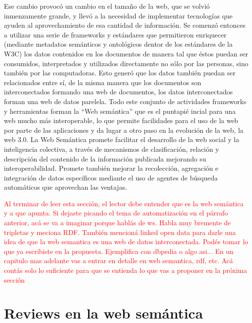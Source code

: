 Ese cambio provocó un cambio en el tamaño de la web, que se volvió inmenzamente grande, y llevó a la necesidad de implementar tecnologías que ayuden al aprovechamiento de esa cantidad de información. 
Se comenzó entonces a utilizar una serie de frameworks y estándares que permitieron enriquecer (mediante metadatos semánticos y ontológicos dentor de los estándares de la W3C) los datos contenidos en los documentos de manera tal que éstos puedan ser consumidos, interpretados y utilizados directamente no sólo por las personas, sino también por las computadoras.
Esto generó que los datos también puedan ser relacionados entre sí, de la misma manera que los documentos son interconectados formando una web de documentos, los datos interconectados forman una web de datos parelela.
Todo este conjunto de actividades frameworks y herramientas forman la ``Web semántica'' que es el puntapié incial para una web mucho más interoperable, lo que permite facilidades para el uso de la web por parte de las aplicaciones y da lugar a otro paso en la evolución de la web, la web 3.0. 
La Web Semántica promete facilitar el desarrollo de la web social y la inteligencia colectiva, a través de mecanismos de clasificación, relación y descripción del contenido de la información publicada mejorando su interoperabilidad. Promete también mejorar la recolección, agregación e integración de datos específicos mediante el uso de agentes de búsqueda automáticos que aprovechan las ventajas.

\begin{framed}
\textcolor{red}{Al terminar de leer esta sección, el lector debe entender que es la web semántica y a que apunta. Si dejaste picando el tema de automatización en el párrafo anterior, acá se va a imaginar porque hablás de ws. Habla muy bremente de tripletas y meciona RDF. También mencioná linked open data para darle una idea de que la web semantica es una web de datos interconectada. Podés tomar lo que ya escribiste en la propuesta. Ejemplifica con dbpedia o algo asi... En un capitulo mas adelante vas a entrar en detalle en web semantica, rdf, etc. Acá contás solo lo suficiente para que se entienda lo que vas a proponer en la próxima sección}
\end{framed}

\section{Reviews en la web semántica}
\label{section:reviews-en-la-web}

